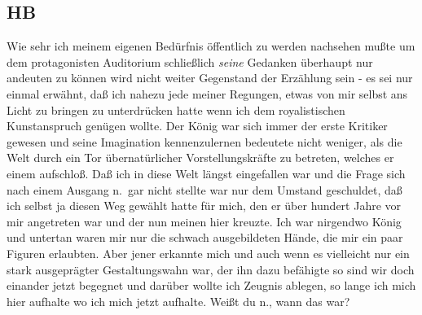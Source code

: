 \documentclass[
]{article}
\author{}
\date{\vspace{-2.5em}}
\begin{document}
\subsection{HB}\label{hb}

Wie sehr ich meinem eigenen Bedürfnis öffentlich zu werden nachsehen
mußte um dem protagonisten Auditorium schließlich \emph{seine} Gedanken
überhaupt nur andeuten zu können wird nicht weiter Gegenstand der
Erzählung sein - es sei nur einmal erwähnt, daß ich nahezu jede meiner
Regungen, etwas von mir selbst ans Licht zu bringen zu unterdrücken
hatte wenn ich dem royalistischen Kunstanspruch genügen wollte. Der
König war sich immer der erste Kritiker gewesen und seine Imagination
kennenzulernen bedeutete nicht weniger, als die Welt durch ein Tor
übernatürlicher Vorstellungskräfte zu betreten, welches er einem
aufschloß. Daß ich in diese Welt längst eingefallen war und die Frage
sich nach einem Ausgang n.~gar nicht stellte war nur dem Umstand
geschuldet, daß ich selbst ja diesen Weg gewählt hatte für mich, den er
über hundert Jahre vor mir angetreten war und der nun meinen hier
kreuzte. Ich war nirgendwo König und untertan waren mir nur die schwach
ausgebildeten Hände, die mir ein paar Figuren erlaubten. Aber jener
erkannte mich und auch wenn es vielleicht nur ein stark ausgeprägter
Gestaltungswahn war, der ihn dazu befähigte so sind wir doch einander
jetzt begegnet und darüber wollte ich Zeugnis ablegen, so lange ich mich
hier aufhalte wo ich mich jetzt aufhalte. Weißt du n., wann das war?
\end{document}
